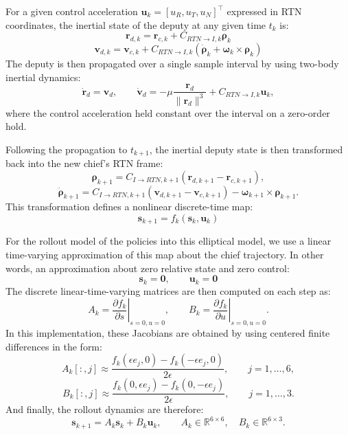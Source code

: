 For a given control acceleration 
$\mathbf{u}_k = [u_R, u_T, u_N]^\top$ expressed in RTN coordinates, the inertial state of the deputy at any given time $t_k$ is:
\[
\mathbf{r}_{d,k} = \mathbf{r}_{c,k} + C_{RTN \to I,k}\boldsymbol{\rho}_k
\]
\[
\mathbf{v}_{d,k} = \mathbf{v}_{c,k} + C_{RTN \to I,k}(\dot{\boldsymbol{\rho}}_k + \boldsymbol{\omega}_k \times \boldsymbol{\rho}_k)
\]
The deputy is then propagated over a single sample interval by using two-body inertial dynamics:
\[
\dot{\mathbf{r}}_d = \mathbf{v}_d,
\qquad
\dot{\mathbf{v}}_d = -\mu \frac{\mathbf{r}_d}{ \|\mathbf{r}_d\|^3} + C_{RTN \to I,k}\mathbf{u}_k,
\]
where the control acceleration held constant over the interval on a zero-order hold.

Following the propagation to $t_{k+1}$, the inertial deputy state is then transformed back into the new chief's RTN frame:
\[
\boldsymbol{\rho}_{k+1}
=
C_{I\to RTN,k+1}
\left(
\boldsymbol{r}_{d,k+1}-\boldsymbol{r}_{c,k+1}
\right),
\]
\[
\dot{\boldsymbol{\rho}}_{k+1}
=
C_{I\to RTN,k+1}
\left(
\boldsymbol{v}_{d,k+1}-\boldsymbol{v}_{c,k+1}
\right)
-
\boldsymbol{\omega}_{k+1}\times \boldsymbol{\rho}_{k+1}.
\]
This transformation defines a nonlinear discrete-time map:
\[
\mathbf{s}_{k+1} = f_k(\mathbf{s}_k, \mathbf{u}_k)
\]


For the rollout model of the policies into this elliptical model, we use a linear time-varying approximation of this map about the chief trajectory. In other words, an approximation about zero relative state and zero control:
\[
\mathbf{s}_k = \mathbf{0},
\qquad
\mathbf{u}_k = \mathbf{0}
\]
The discrete linear-time-varying matrices are then computed on each step as:
\[
A_k
=
\left.
\frac{\partial f_k}{\partial s}
\right|_{s=0,u=0},
\qquad
B_k
=
\left.
\frac{\partial f_k}{\partial u}
\right|_{s=0,u=0}.
\]
In this implementation, these Jacobians are obtained by using centered finite differences in the form:
\[
A_k[:,j]
\approx
\frac{
f_k(\epsilon e_j,0) - f_k(-\epsilon e_j,0)
}{2\epsilon},
\qquad
j=1,\ldots,6,
\]
\[
B_k[:,j]
\approx
\frac{
f_k(0,\epsilon e_j) - f_k(0,-\epsilon e_j)
}{2\epsilon},
\qquad
j=1,\ldots,3.
\]
And finally, the rollout dynamics are therefore:
\[
\mathbf{s}_{k+1} = A_k\mathbf{s}_k + B_k\mathbf{u}_k,
\qquad
A_k \in \mathbb{R}^{6\times 6},
\quad
B_k \in \mathbb{R}^{6\times 3}.
\]

